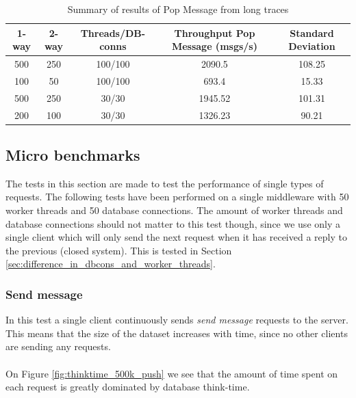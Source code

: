 \documentclass{article}
\begin{document}
            \begin{table}[H]
                \label{table:long_trace_test_summary_popmessage}
                \caption{Summary of results of Pop Message from long traces}
                \begin{adjustwidth}{-2cm}{}
                    \begin{tabular}{|c|c|c|c|c|}
                        \hline 
                        \textbf{1-way} & \textbf{2-way} & \textbf{Threads/DB-conns} & \textbf{Throughput Pop Message (msgs/s)} & \textbf{Standard Deviation} \\ 
                        \hline 
                        500 & 250 & 100/100 &2090.5 &108.25\\
                        \hline
                        100 & 50 & 100/100 &693.4 &15.33\\
                        \hline 
                        500 & 250 & 30/30 &1945.52 &101.31\\
                        \hline
                        200 & 100 & 30/30 &1326.23 &90.21\\
                        \hline
                    \end{tabular} 
                \end{adjustwidth}
            \end{table}

        \subsection{Micro benchmarks}
            The tests in this section are made to test the performance of single types of requests. The following tests have been performed on a single middleware with 50 worker threads and 50 database connections. The amount of worker threads and database connections should not matter to this test though, since we use only a single client which will only send the next request when it has received a reply to the previous (closed system). This is tested in Section \ref{sec:difference_in_dbcons_and_worker_threads}.

            \subsubsection{Send message}
                In this test a single client continuously sends \textit{send message} requests to the server. This means that the size of the dataset increases with time, since no other clients are sending any requests.\\
                \\
                On Figure \ref{fig:thinktime_500k_push} we see that the amount of time spent on each request is greatly dominated by database think-time.
\end{document}
